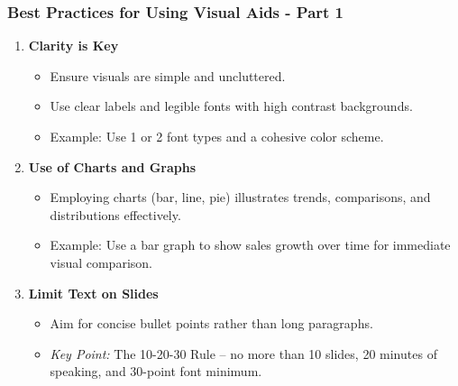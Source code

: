 \documentclass[aspectratio=169]{beamer}
\begin{document}
\begin{frame}[fragile]
    \frametitle{Best Practices for Using Visual Aids - Part 1}
    \begin{enumerate}
        \item \textbf{Clarity is Key}
        \begin{itemize}
            \item Ensure visuals are simple and uncluttered.
            \item Use clear labels and legible fonts with high contrast backgrounds.
            \item Example: Use 1 or 2 font types and a cohesive color scheme.
        \end{itemize}

        \item \textbf{Use of Charts and Graphs}
        \begin{itemize}
            \item Employing charts (bar, line, pie) illustrates trends, comparisons, and distributions effectively.
            \item Example: Use a bar graph to show sales growth over time for immediate visual comparison.
        \end{itemize}

        \item \textbf{Limit Text on Slides}
        \begin{itemize}
            \item Aim for concise bullet points rather than long paragraphs.
            \item \textit{Key Point:} The 10-20-30 Rule – no more than 10 slides, 20 minutes of speaking, and 30-point font minimum.
        \end{itemize}
    \end{enumerate}
\end{frame}
\end{document}
